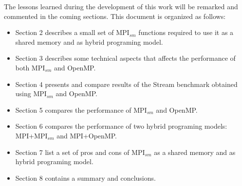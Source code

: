 \medskip

The lessons learned during the development of this work will be remarked and commented in the coming sections. This document is organized as follows:

\begin{itemize} 
\item Section 2 describes a small set of MPI$_{sm}$ functions required to use it as a shared memory and as hybrid programing model.

\item Section 3 describes some technical aspects that affects the performance of both MPI$_{sm}$ and OpenMP.

\item Section 4 presents and compare results of the Stream benchmark obtained using MPI$_{sm}$ and OpenMP.

\item Section 5 compares the performance of MPI$_{sm}$ and OpenMP.

\item Section 6 compares the performance of two hybrid programing models: MPI+MPI$_{sm}$ and MPI+OpenMP.

\item Section 7 list a set of pros and cons of MPI$_{sm}$ as a shared memory and as hybrid programing model.

\item Section 8 contains a summary and conclusions.



\end{itemize}








